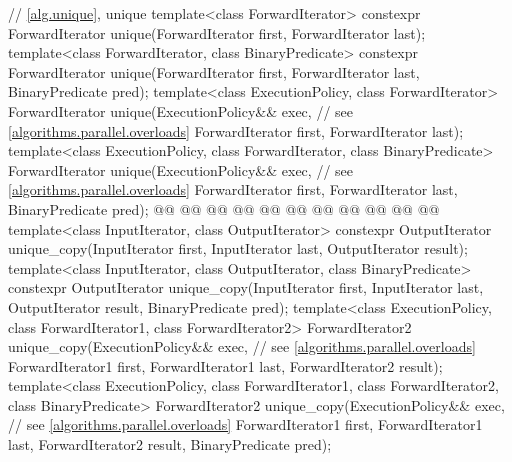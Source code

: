 \begin{codeblock}
{  // \ref{alg.unique}, unique
  template<class ForwardIterator>
    constexpr ForwardIterator unique(ForwardIterator first, ForwardIterator last);
  template<class ForwardIterator, class BinaryPredicate>
    constexpr ForwardIterator unique(ForwardIterator first, ForwardIterator last,
                                     BinaryPredicate pred);
  template<class ExecutionPolicy, class ForwardIterator>
    ForwardIterator unique(ExecutionPolicy&& exec, // see \ref{algorithms.parallel.overloads}
                           ForwardIterator first, ForwardIterator last);
  template<class ExecutionPolicy, class ForwardIterator, class BinaryPredicate>
    ForwardIterator unique(ExecutionPolicy&& exec, // see \ref{algorithms.parallel.overloads}
                           ForwardIterator first, ForwardIterator last,
                           BinaryPredicate pred);
  @@
    @@
        @@
      @@
      @@
    @@
        @@
      @@
      @@
        @@
  @\added{\}}@
  template<class InputIterator, class OutputIterator>
    constexpr OutputIterator
      unique_copy(InputIterator first, InputIterator last,
                  OutputIterator result);
  template<class InputIterator, class OutputIterator, class BinaryPredicate>
    constexpr OutputIterator
      unique_copy(InputIterator first, InputIterator last,
                  OutputIterator result, BinaryPredicate pred);
  template<class ExecutionPolicy, class ForwardIterator1, class ForwardIterator2>
    ForwardIterator2
      unique_copy(ExecutionPolicy&& exec, // see \ref{algorithms.parallel.overloads}
                  ForwardIterator1 first, ForwardIterator1 last,
                  ForwardIterator2 result);
  template<class ExecutionPolicy, class ForwardIterator1, class ForwardIterator2,
           class BinaryPredicate>
    ForwardIterator2
      unique_copy(ExecutionPolicy&& exec, // see \ref{algorithms.parallel.overloads}
                  ForwardIterator1 first, ForwardIterator1 last,
                  ForwardIterator2 result, BinaryPredicate pred);
}
\end{codeblock}
